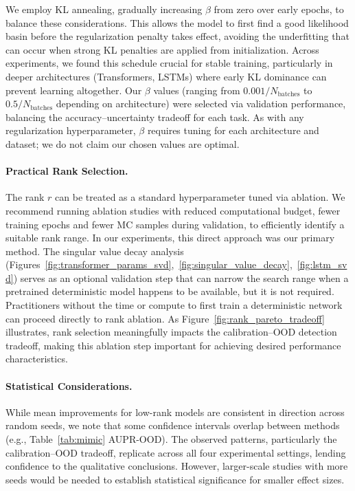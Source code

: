 \documentclass{article}
\theoremstyle{plain}
\theoremstyle{definition}
\theoremstyle{remark}
\begin{document}
We employ KL annealing, gradually increasing $\beta$ from zero over early epochs, to balance these considerations. This allows the model to first find a good likelihood basin before the regularization penalty takes effect, avoiding the underfitting that can occur when strong KL penalties are applied from initialization. Across experiments, we found this schedule crucial for stable training, particularly in deeper architectures (Transformers, LSTMs) where early KL dominance can prevent learning altogether. Our $\beta$ values (ranging from $0.001/N_{\text{batches}}$ to $0.5/N_{\text{batches}}$ depending on architecture) were selected via validation performance, balancing the accuracy--uncertainty tradeoff for each task. As with any regularization hyperparameter, $\beta$ requires tuning for each architecture and dataset; we do not claim our chosen values are optimal.

\paragraph{Practical Rank Selection.}
The rank $r$ can be treated as a standard hyperparameter tuned via ablation. We recommend running ablation studies with reduced computational budget, fewer training epochs and fewer MC samples during validation, to efficiently identify a suitable rank range. In our experiments, this direct approach was our primary method. The singular value decay analysis (Figures~\ref{fig:transformer_params_svd},~\ref{fig:singular_value_decay},~\ref{fig:lstm_svd}) serves as an optional validation step that can narrow the search range when a pretrained deterministic model happens to be available, but it is not required. Practitioners without the time or compute to first train a deterministic network can proceed directly to rank ablation. As Figure~\ref{fig:rank_pareto_tradeoff} illustrates, rank selection meaningfully impacts the calibration--OOD detection tradeoff, making this ablation step important for achieving desired performance characteristics.

\paragraph{Statistical Considerations.}
While mean improvements for low-rank models are consistent in direction across random seeds, we note that some confidence intervals overlap between methods (e.g., Table~\ref{tab:mimic} AUPR-OOD). The observed patterns, particularly the calibration--OOD tradeoff, replicate across all four experimental settings, lending confidence to the qualitative conclusions. However, larger-scale studies with more seeds would be needed to establish statistical significance for smaller effect sizes.
\end{document}
